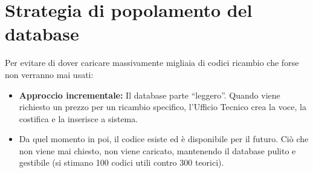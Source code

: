 \documentclass[12pt, a4paper]{article} %
\begin{document}
\section{Strategia di popolamento del database}
Per evitare di dover caricare massivamente migliaia di codici ricambio che forse non verranno mai usati:

\begin{itemize}
    \item \textbf{Approccio incrementale:} Il database parte ``leggero''. Quando viene richiesto un prezzo per un ricambio specifico, l'Ufficio Tecnico crea la voce, la costifica e la inserisce a sistema.
    \item Da quel momento in poi, il codice esiste ed è disponibile per il futuro. Ciò che non viene mai chiesto, non viene caricato, mantenendo il database pulito e gestibile (si stimano 100 codici utili contro 300 teorici).
\end{itemize}
\end{document}
